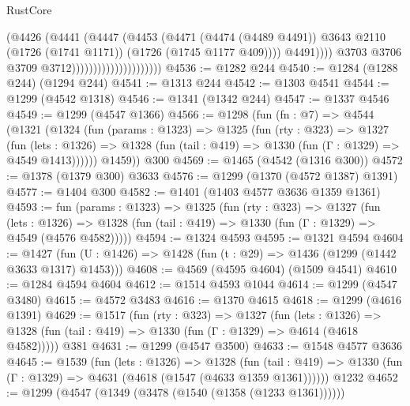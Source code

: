 \begin{lexlean}{RustCore}
\begin{coremodule}
                                                (@4426
                                                  (@4441
                                                    (@4447
                                                      (@4453
                                                        (@4471
                                                          (@4474 (@4489 @4491))
                                                          @3643
                                                          @2110
                                                          (@1726 (@1741 @1171))
                                                          (@1726 (@1745 @1177 @409))))
                                                      @4491))))
                                              @3703
                                              @3706
                                              @3709
                                              @3712)))))))))))))))))))))
@4536 := @1282 @244
@4540 := @1284 (@1288 @244) (@1294 @244)
@4541 := @1313 @244
@4542 := @1303 @4541
@4544 := @1299 (@4542 @1318)
@4546 := @1341 (@1342 @244)
@4547 := @1337 @4546
@4549 := @1299 (@4547 @1366)
@4566 := @1298
    (fun (fn : @7) =>
    @4544
      (@1321
        (@1324
          (fun (params : @1323) =>
          @1325
            (fun (rty : @323) =>
            @1327
              (fun (lets : @1326) =>
              @1328 (fun (tail : @419) => @1330 (fun (Γ : @1329) => @4549 @1413))))))
        @1459))
    @300
@4569 := @1465 (@4542 (@1316 @300))
@4572 := @1378 (@1379 @300) @3633
@4576 := @1299 (@1370 (@4572 @1387) @1391)
@4577 := @1404 @300
@4582 := @1401 (@1403 @4577 @3636 @1359 @1361)
@4593 := fun (params : @1323) =>
  @1325
    (fun (rty : @323) =>
    @1327
      (fun (lets : @1326) =>
      @1328 (fun (tail : @419) => @1330 (fun (Γ : @1329) => @4549 (@4576 @4582)))))
@4594 := @1324 @4593
@4595 := @1321 @4594
@4604 := @1427 (fun (U : @1426) => @1428 (fun (t : @29) => @1436 (@1299 (@1442 @3633 @1317) @1453)))
@4608 := @4569 (@4595 @4604) (@1509 @4541)
@4610 := @1284 @4594 @4604
@4612 := @1514 @4593 @1044
@4614 := @1299 (@4547 @3480)
@4615 := @4572 @3483
@4616 := @1370 @4615
@4618 := @1299 (@4616 @1391)
@4629 := @1517
    (fun (rty : @323) =>
    @1327
      (fun (lets : @1326) =>
      @1328 (fun (tail : @419) => @1330 (fun (Γ : @1329) => @4614 (@4618 @4582)))))
    @381
@4631 := @1299 (@4547 @3500)
@4633 := @1548 @4577 @3636
@4645 := @1539
    (fun (lets : @1326) =>
    @1328
      (fun (tail : @419) => @1330 (fun (Γ : @1329) => @4631 (@4618 (@1547 (@4633 @1359 @1361))))))
    @1232
@4652 := @1299 (@4547 (@1349 (@3478 (@1540 (@1358 (@1233 @1361))))))

\end{coremodule}
\end{lexlean}
